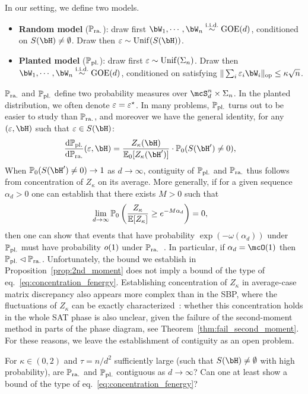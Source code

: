 \myskip
In our setting, we define two models.
\begin{itemize}[leftmargin=*]
    \item \textbf{Random model} ($\mathbb{P}_{\mathrm{ra.}}$): draw first $\bW_1, \cdots, \bW_n \iid \GOE(d)$, conditioned on $S(\bH) \neq \emptyset$.
    Draw then $\eps \sim \Unif(S(\bH))$.
    \item \textbf{Planted model} ($\mathbb{P}_{\mathrm{pl.}}$): draw first $\varepsilon \sim \mathrm{Unif}(\Sigma_n)$. Draw then $\bW_1, \cdots, \bW_n \iid \GOE(d)$, conditioned on 
    satisfying $\|\sum_i \eps_i \bW_i\|_\op \leq \kappa \sqrt{n}$.
\end{itemize}
$\mathbb{P}_{\mathrm{ra.}}$ and $\mathbb{P}_{\mathrm{pl.}}$ define two probability measures over $\mcS_d^n \times \Sigma_n$. In the planted distribution, 
we often denote $\varepsilon = \varepsilon^\star$.
In many problems, $\mathbb{P}_{\mathrm{pl.}}$ turns out to be easier to study than $\mathbb{P}_{\mathrm{ra.}}$, and moreover we have the general identity, 
for any $(\eps, \bH)$ such that $\eps \in S(\bH)$:
\begin{align}\label{eq:planted_random}
    \frac{\rd \bbP_{\pl}}{\rd \bbP_{\ra}}(\eps, \bH) &= \frac{Z_\kappa(\bH)}{\EE_0[Z_\kappa(\bH')]} \cdot \bbP_0(S(\bH') \neq 0),
\end{align}
When $\bbP_0(S(\bH') \neq 0) \to 1$ as $d \to \infty$, contiguity of $\mathbb{P}_{\mathrm{pl.}}$ and $\mathbb{P}_{\mathrm{ra.}}$ thus follows from concentration of $Z_\kappa$ on its average. 
More generally,
if for a given sequence $\alpha_d > 0$ one can establish that there exists $M > 0$ such that
\begin{align}\label{eq:concentration_fenergy}
    \lim_{d \to \infty}\mathbb{P}_0\left(\frac{Z_\kappa}{\mathbb{E}[Z_\kappa]} \geq e^{-M\alpha_d}\right) &= 0,
\end{align}
then one can show that events that have probability $\exp(-\omega(\alpha_d))$ under $\mathbb{P}_{\mathrm{pl.}}$ must have probability $o(1)$ under $\mathbb{P}_{\mathrm{ra.}}$~\citep{perkins2021frozen}.
In particular, if $\alpha_d = \mcO(1)$ then $\mathbb{P}_{\mathrm{pl.}} \lhd \mathbb{P}_{\mathrm{ra.}}$.
Unfortunately, the bound we establish in Proposition~\ref{prop:2nd_moment} does not imply a bound of the type of eq.~\eqref{eq:concentration_fenergy}.
Establishing concentration of $Z_\kappa$ in average-case matrix discrepancy also appears more complex than in the SBP, 
where the fluctuations of $Z_\kappa$ can be exactly characterized~\citep{abbe2022proof}:
whether this concentration holds in the whole SAT phase is also unclear, given the failure of the second-moment method in parts of the phase diagram, see Theorem~\ref{thm:fail_second_moment}.
For these reasons, we leave the establishment of contiguity as an open problem.
\begin{openquestion}[Contiguity]\label{op:contiguity}
    For $\kappa \in (0,2)$ and $\tau = n/d^2$ sufficiently large (such that $S(\bH) \neq \emptyset$ with high probability), are $\mathbb{P}_{\mathrm{ra.}}$ and $\mathbb{P}_{\mathrm{pl.}}$  
    contiguous as $d \to \infty$? Can one at least show a bound of the type of eq.~\eqref{eq:concentration_fenergy}?
\end{openquestion}

